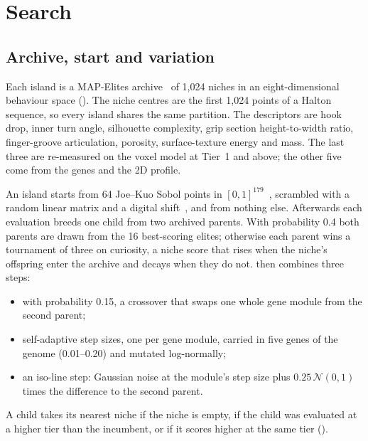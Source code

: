 \section{Search}\label{sec:search}
\subsection{Archive, start and variation}
Each island is a MAP-Elites archive~\cite{mouret2015,vassiliades2018} of 1,024 niches in an eight-dimensional behaviour
space (). The niche centres are the first 1,024 points of a
Halton sequence, so every island shares the same partition. The descriptors are hook drop, inner turn angle, silhouette
complexity, grip section height-to-width ratio, finger-groove articulation, porosity, surface-texture energy and mass.
The last three are re-measured on the voxel model at Tier~1 and above; the other five come from the genes and the 2D
profile.

An island starts from 64 Joe--Kuo Sobol points in $[0,1]^{179}$~\cite{joe2008}, scrambled with a random linear matrix
and a digital shift~\cite{matousek1998}, and from nothing else. Afterwards each evaluation breeds one child from two
archived parents. With probability 0.4 both parents are drawn from the 16 best-scoring elites; otherwise each parent
wins a tournament of three on curiosity, a niche score that rises when the niche's offspring enter the archive and
decays when they do not.
 then combines three steps:
\begin{itemize}
\item with probability 0.15, a crossover that swaps one whole gene module from the second parent;
\item self-adaptive step sizes, one per gene module, carried in five genes of the genome (0.01--0.20) and mutated
log-normally;
\item an iso-line step: Gaussian noise at the module's step size plus $0.25\,\mathcal{N}(0,1)$ times the difference to
the second parent.
\end{itemize}
A child takes its nearest niche if the niche is empty, if the child was evaluated at a higher tier than the incumbent,
or if it scores higher at the same tier ().

